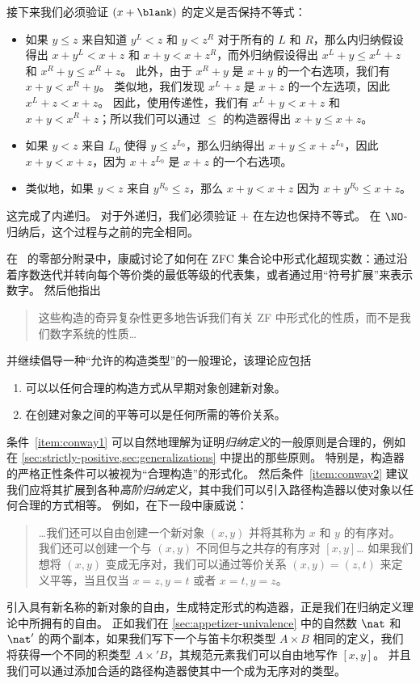 \begin{eg}
接下来我们必须验证 $(x+\blank)$ 的定义是否保持不等式：
\begin{itemize}
  \item 如果 $y\le z$ 来自知道 $y^L<z$ 和 $y<z^R$ 对于所有的 $L$ 和 $R$，那么内归纳假设得出 $x+y^L<x+z$ 和 $x+y < x+z^R$，而外归纳假设得出 $x^L+y \le x^L+z$ 和 $x^R+ y \le x^R+z$。
  此外，由于 $x^R+y$ 是 $x+y$ 的一个右选项，我们有 $x+y < x^R+y$。
  类似地，我们发现 $x^L+z$ 是 $x+z$ 的一个左选项，因此 $x^L+z < x+z$。
  因此，使用传递性，我们有 $x^L+y < x+z$ 和 $x+y < x^R+z$；所以我们可以通过 $\le$ 的构造器得出 $x+y \le x+z$。
  \item 如果 $y<z$ 来自 $L_0$ 使得 $y\le z^{L_0}$，那么归纳得出 $x+y \le x+z^{L_0}$，因此 $x+y<x+z$，因为 $x+z^{L_0}$ 是 $x+z$ 的一个右选项。
  \item 类似地，如果 $y<z$ 来自 $y^{R_0}\le z$，那么 $x+y<x+z$ 因为 $x+y^{R_0}\le x+z$。
\end{itemize}
这完成了内递归。
对于外递归，我们必须验证 $+$ 在左边也保持不等式。
在 $\NO$-归纳后，这个过程与之前的完全相同。
\end{eg}

%
%
在~\cite{conway:onag} 的零部分附录中，康威讨论了如何在 ZFC 集合论中形式化超现实数：通过沿着序数迭代并转向每个等价类的最低等级的代表集，或者通过用“符号扩展”来表示数字。
然后他指出
\begin{quote}\footnotesize
这些构造的奇异复杂性更多地告诉我们有关 ZF 中形式化的性质，而不是我们数字系统的性质\dots
\end{quote}
并继续倡导一种“允许的构造类型”的一般理论，该理论应包括
\begin{enumerate}\footnotesize
\item 可以以任何合理的构造方式从早期对象创建新对象。\label{item:conway1}
\item 在创建对象之间的平等可以是任何所需的等价关系。\label{item:conway2}
\end{enumerate}
\noindent
条件~\ref{item:conway1} 可以自然地理解为证明\emph{归纳定义}的一般原则是合理的，例如在 \cref{sec:strictly-positive,sec:generalizations} 中提出的那些原则。
特别是，构造器的严格正性条件可以被视为“合理构造”的形式化。
然后条件~\ref{item:conway2} 建议我们应将其扩展到各种\emph{高阶归纳定义}，其中我们可以引入路径构造器以使对象以任何合理的方式相等。
例如，在下一段中康威说：
\begin{quote}\footnotesize
\dots 我们还可以自由创建一个新对象 $(x,y)$ 并将其称为 $x$ 和 $y$ 的有序对。
我们还可以创建一个与 $(x,y)$ 不同但与之共存的有序对 $[x,y]$\dots
如果我们想将 $(x,y)$ 变成无序对，我们可以通过等价关系 $(x,y)=(z,t)$ 来定义平等，当且仅当 $x=z,y=t$ 或者 $x=t,y=z$。
\end{quote}
引入具有新名称的新对象的自由，生成特定形式的构造器，正是我们在归纳定义理论中所拥有的自由。
正如我们在 \cref{sec:appetizer-univalence} 中的自然数 $\nat$ 和 $\nat'$ 的两个副本，如果我们写下一个与笛卡尔积类型 $A\times B$ 相同的定义，我们将获得一个不同的积类型 $A\times' B$，其规范元素我们可以自由地写作 $[x,y]$。
并且我们可以通过添加合适的路径构造器使其中一个成为无序对的类型。%

